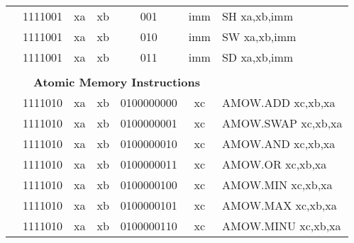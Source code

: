 \begin{table}[p]
\begin{small}
\begin{center}
\begin{tabular}{rcccccccccl}
&
\multicolumn{2}{|c|}{1111001} &
\multicolumn{1}{c|}{xa} &
\multicolumn{1}{c|}{xb} &
\multicolumn{1}{c|}{001} &
\multicolumn{4}{c|}{imm} & SH xa,xb,imm \\
\cline{2-10}
  

&
\multicolumn{2}{|c|}{1111001} &
\multicolumn{1}{c|}{xa} &
\multicolumn{1}{c|}{xb} &
\multicolumn{1}{c|}{010} &
\multicolumn{4}{c|}{imm} & SW xa,xb,imm \\
\cline{2-10}
  

&
\multicolumn{2}{|c|}{1111001} &
\multicolumn{1}{c|}{xa} &
\multicolumn{1}{c|}{xb} &
\multicolumn{1}{c|}{011} &
\multicolumn{4}{c|}{imm} & SD xa,xb,imm \\
\cline{2-10}
  

&
\multicolumn{9}{c}{} & \\
&
\multicolumn{9}{c}{\bf Atomic Memory Instructions} & \\
\cline{2-10}
  

&
\multicolumn{2}{|c|}{1111010} &
\multicolumn{1}{c|}{xa} &
\multicolumn{1}{c|}{xb} &
\multicolumn{4}{c|}{0100000000} &
\multicolumn{1}{c|}{xc} & AMOW.ADD xc,xb,xa \\
\cline{2-10}
  

&
\multicolumn{2}{|c|}{1111010} &
\multicolumn{1}{c|}{xa} &
\multicolumn{1}{c|}{xb} &
\multicolumn{4}{c|}{0100000001} &
\multicolumn{1}{c|}{xc} & AMOW.SWAP xc,xb,xa \\
\cline{2-10}
  

&
\multicolumn{2}{|c|}{1111010} &
\multicolumn{1}{c|}{xa} &
\multicolumn{1}{c|}{xb} &
\multicolumn{4}{c|}{0100000010} &
\multicolumn{1}{c|}{xc} & AMOW.AND xc,xb,xa \\
\cline{2-10}
  

&
\multicolumn{2}{|c|}{1111010} &
\multicolumn{1}{c|}{xa} &
\multicolumn{1}{c|}{xb} &
\multicolumn{4}{c|}{0100000011} &
\multicolumn{1}{c|}{xc} & AMOW.OR xc,xb,xa \\
\cline{2-10}
  

&
\multicolumn{2}{|c|}{1111010} &
\multicolumn{1}{c|}{xa} &
\multicolumn{1}{c|}{xb} &
\multicolumn{4}{c|}{0100000100} &
\multicolumn{1}{c|}{xc} & AMOW.MIN xc,xb,xa \\
\cline{2-10}
  

&
\multicolumn{2}{|c|}{1111010} &
\multicolumn{1}{c|}{xa} &
\multicolumn{1}{c|}{xb} &
\multicolumn{4}{c|}{0100000101} &
\multicolumn{1}{c|}{xc} & AMOW.MAX xc,xb,xa \\
\cline{2-10}
  

&
\multicolumn{2}{|c|}{1111010} &
\multicolumn{1}{c|}{xa} &
\multicolumn{1}{c|}{xb} &
\multicolumn{4}{c|}{0100000110} &
\multicolumn{1}{c|}{xc} & AMOW.MINU xc,xb,xa \\
\cline{2-10}
  


\end{tabular}
\end{center}
\end{small}
\end{table}
